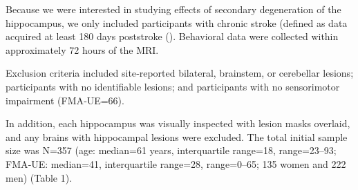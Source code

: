 \documentclass[10pt]{article}
\begin{document}
Because we were interested in studying effects of secondary degeneration of the hippocampus, we only included participants with chronic stroke (defined as data acquired at least 180 days poststroke (\cite{Bernhardt2017-av}). Behavioral data were collected within approximately 72 hours of the MRI. 

Exclusion criteria included site‐reported bilateral, brainstem, or cerebellar lesions; participants with no identifiable lesions; and participants with no sensorimotor impairment (FMA‐UE=66).

In addition, each hippocampus was visually inspected with lesion masks overlaid, and any brains with hippocampal lesions were excluded. The total initial sample size was N=357 (age: median=61 years, interquartile range=18, range=23–93; FMA‐UE: median=41, interquartile range=28, range=0–65; 135 women and 222 men) (Table 1).
\end{document}
